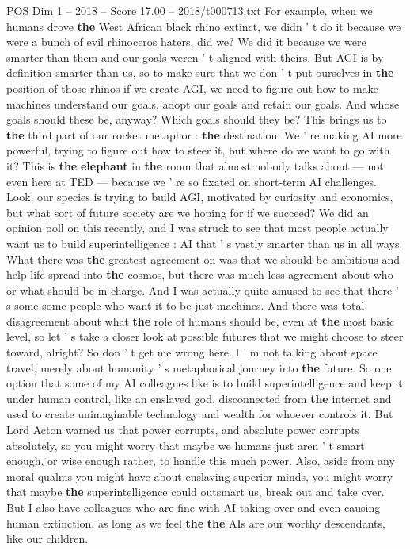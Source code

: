 \begin{textsample}{POS Dim 1 – 2018 – Score 17.00 – 2018/t000713.txt}
For example, when we humans drove \textbf{the} West African black rhino extinct, we didn ' t do it because we were a bunch of evil rhinoceros haters, did we?
We did it because we were smarter than them and our goals weren ' t aligned with theirs.
But AGI is by definition smarter than us, so to make sure that we don ' t put ourselves in \textbf{the} position of those rhinos if we create AGI, we need to figure out how to make machines understand our goals, adopt our goals and retain our goals.
And whose goals should these be, anyway?
Which goals should they be?
This brings us to \textbf{the} third part of our rocket metaphor : \textbf{the} destination.
We ' re making AI more powerful, trying to figure out how to steer it, but where do we want to go with it?
This is \textbf{the} \textbf{elephant} in \textbf{the} room that almost nobody talks about — not even here at TED — because we ' re so fixated on short-term AI challenges.
Look, our species is trying to build AGI, motivated by curiosity and economics, but what sort of future society are we hoping for if we succeed?
We did an opinion poll on this recently, and I was struck to see that most people actually want us to build superintelligence : AI that ' s vastly smarter than us in all ways.
What there was \textbf{the} greatest agreement on was that we should be ambitious and help life spread into \textbf{the} cosmos, but there was much less agreement about who or what should be in charge.
And I was actually quite amused to see that there ' s some some people who want it to be just machines.
And there was total disagreement about what \textbf{the} role of humans should be, even at \textbf{the} most basic level, so let ' s take a closer look at possible futures that we might choose to steer toward, alright?
So don ' t get me wrong here.
I ' m not talking about space travel, merely about humanity ' s metaphorical journey into \textbf{the} future.
So one option that some of my AI colleagues like is to build superintelligence and keep it under human control, like an enslaved god, disconnected from \textbf{the} internet and used to create unimaginable technology and wealth for whoever controls it.
But Lord Acton warned us that power corrupts, and absolute power corrupts absolutely, so you might worry that maybe we humans just aren ' t smart enough, or wise enough rather, to handle this much power.
Also, aside from any moral qualms you might have about enslaving superior minds, you might worry that maybe \textbf{the} superintelligence could outsmart us, break out and take over.
But I also have colleagues who are fine with AI taking over and even causing human extinction, as long as we feel \textbf{the} \textbf{the} AIs are our worthy descendants, like our children.

\end{textsample}
